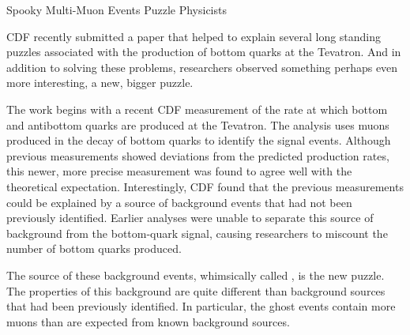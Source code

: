 \begin{MyArticle}[enhanced, tikz={rotate=0}, width=0.24\textwidth]{Spooky Multi-Muon Events Puzzle Physicists}
  \begin{multicols}{2}
    CDF recently submitted a paper that helped to explain several long
    standing puzzles associated with the production of bottom quarks
    at the Tevatron. And in addition to solving these problems,
    researchers observed something perhaps even more interesting, a
    new, bigger puzzle.

    The work begins with a recent CDF measurement of the rate at which
    bottom and antibottom quarks are produced at the Tevatron. The
    analysis uses muons produced in the decay of bottom quarks to identify
    the signal events. Although previous measurements showed deviations
    from the predicted production rates, this newer, more precise
    measurement was found to agree well with the theoretical
    expectation. Interestingly, CDF found that the previous measurements
    could be explained by a source of background events that had not been
    previously identified. Earlier analyses were unable to separate this
    source of background from the bottom-quark signal, causing researchers
    to miscount the number of bottom quarks produced.

    The source of these background events, whimsically called , is the new puzzle. The properties of this background are
    quite different than background sources that had been previously
    identified. In particular, the ghost events contain more muons than
    are expected from known background sources.

    

\end{multicols}
\end{MyArticle}
